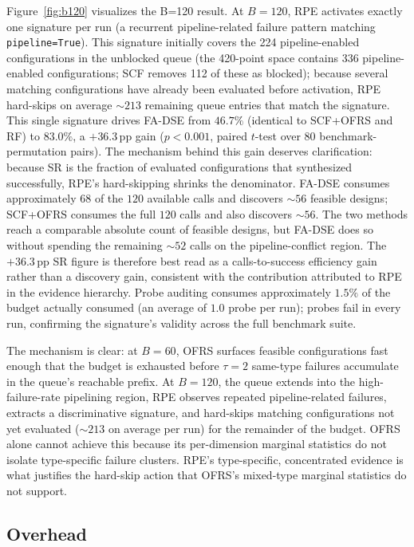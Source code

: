 \documentclass[journal]{IEEEtran}
\begin{document}
Figure~\ref{fig:b120} visualizes the B=120 result. At $B{=}120$, RPE activates exactly one signature per run (a recurrent pipeline-related failure pattern matching \texttt{pipeline=True}). This signature initially covers the 224 pipeline-enabled configurations in the unblocked queue (the 420-point space contains 336 pipeline-enabled configurations; SCF removes 112 of these as blocked); because several matching configurations have already been evaluated before activation, RPE hard-skips on average $\sim 213$ remaining queue entries that match the signature. This single signature drives FA-DSE from $46.7\%$ (identical to SCF+OFRS and RF) to $83.0\%$, a $+36.3$\,pp gain ($p < 0.001$, paired $t$-test over 80 benchmark-permutation pairs). The mechanism behind this gain deserves clarification: because SR is the fraction of evaluated configurations that synthesized successfully, RPE's hard-skipping shrinks the denominator. FA-DSE consumes approximately $68$ of the $120$ available calls and discovers $\sim 56$ feasible designs; SCF+OFRS consumes the full $120$ calls and also discovers $\sim 56$. The two methods reach a comparable absolute count of feasible designs, but FA-DSE does so without spending the remaining $\sim 52$ calls on the pipeline-conflict region. The $+36.3$\,pp SR figure is therefore best read as a calls-to-success efficiency gain rather than a discovery gain, consistent with the contribution attributed to RPE in the evidence hierarchy. Probe auditing consumes approximately $1.5\%$ of the budget actually consumed (an average of $1.0$ probe per run); probes fail in every run, confirming the signature's validity across the full benchmark suite.

The mechanism is clear: at $B{=}60$, OFRS surfaces feasible configurations fast enough that the budget is exhausted before $\tau{=}2$ same-type failures accumulate in the queue's reachable prefix. At $B{=}120$, the queue extends into the high-failure-rate pipelining region, RPE observes repeated pipeline-related failures, extracts a discriminative signature, and hard-skips matching configurations not yet evaluated ($\sim 213$ on average per run) for the remainder of the budget. OFRS alone cannot achieve this because its per-dimension marginal statistics do not isolate type-specific failure clusters. RPE's type-specific, concentrated evidence is what justifies the hard-skip action that OFRS's mixed-type marginal statistics do not support.

\subsection{Overhead}
\label{sec:overhead}
\end{document}
